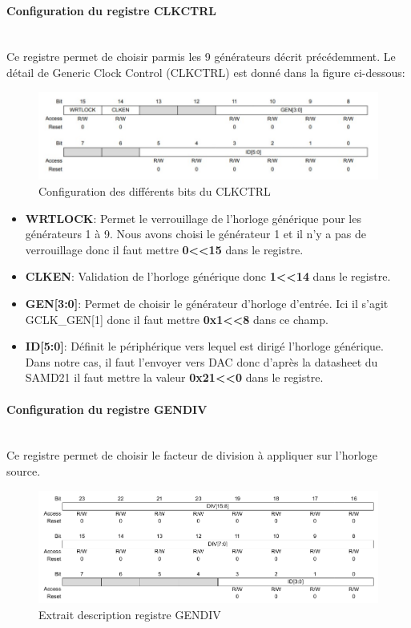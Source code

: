 \documentclass[a4paper]{article}
\begin{document}
\paragraph{Configuration du registre CLKCTRL} 
~~\\
Ce registre permet de choisir parmis les 9 générateurs décrit précédemment. Le détail de Generic Clock Control (CLKCTRL) est donné dans la figure ci-dessous:
\begin{figure}[H]
	\centering
	\includegraphics[width=12cm]{CLKCTRL.jpg}
	\caption{Configuration des différents bits du CLKCTRL}
\end{figure}

\begin{itemize}
	\item {\bf WRTLOCK}: Permet le verrouillage de l’horloge générique pour les générateurs 1 à 9. Nous avons choisi le générateur 1 et il n’y a pas de verrouillage donc il faut mettre {\bf 0\textless\textless15} dans le registre.~~\\
	\item {\bf CLKEN}: Validation de l’horloge générique donc {\bf 1\textless\textless14} dans le registre.~~\\
	\item {\bf GEN[3:0]}: Permet de choisir le générateur d’horloge d’entrée. Ici il s’agit GCLK\_GEN[1] donc il faut mettre {\bf 0x1\textless\textless8} dans ce champ.~~\\
	\item {\bf ID[5:0]}: Définit le périphérique vers lequel est dirigé l’horloge générique. Dans notre cas, il faut l’envoyer vers DAC donc d’après la datasheet du SAMD21 il faut mettre la valeur {\bf 0x21\textless\textless0} dans le registre.~~\\
\end{itemize}
\paragraph{Configuration du registre GENDIV} 
~~\\
Ce registre permet de choisir le facteur de division à appliquer sur l'horloge source.
\begin{figure}[H]
	\centering
	\includegraphics[width=12cm]{GENDIV}
	\caption{Extrait description registre GENDIV}
\end{figure}
\end{document}
